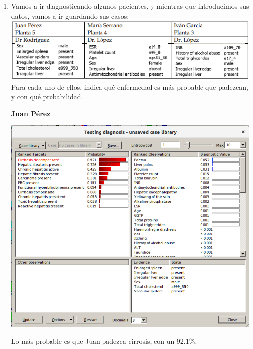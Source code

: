 \documentclass{article}
\begin{document}
\begin{enumerate}[label=\alph*)]
\item Vamos a ir diagnosticando algunos pacientes, y mientras que introducimos sus datos, vamos a ir guardando sus casos:\\
\includegraphics[scale=0.5]{tablaOpcional.png}
\\Para cada uno de ellos, indica qué enfermedad es más probable que padezcan, y con qué probabilidad.

\textbf{Juan Pérez}
\begin{flushleft}
\includegraphics[scale=0.4]{Juan.png}
\end{flushleft}

Lo más probable es que Juan padezca cirrosis, con un 92.1\%.

\newpage


\end{enumerate}
\end{document}

